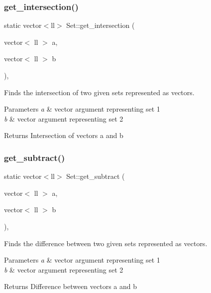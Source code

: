 \subsubsection{\texorpdfstring{get\+\_\+intersection()}{get\_intersection()}}
{\footnotesize\ttfamily static vector$<$ll$>$ Set\+::get\+\_\+intersection (\begin{DoxyParamCaption}\item[{vector$<$ ll $>$}]{a,  }\item[{vector$<$ ll $>$}]{b }\end{DoxyParamCaption})\hspace{0.3cm}{\ttfamily [inline]}, {\ttfamily [static]}}



Finds the intersection of two given sets represented as vectors. 


\begin{DoxyParams}{Parameters}
{\em a} & vector argument representing set 1 \\
\hline
{\em b} & vector argument representing set 2 \\
\hline
\end{DoxyParams}
\begin{DoxyReturn}{Returns}
Intersection of vectors a and b 
\end{DoxyReturn}
\mbox{\label{classSet_af26ca0bfd2f6eb413c2265698801e5fd}} 
\subsubsection{\texorpdfstring{get\+\_\+subtract()}{get\_subtract()}}
{\footnotesize\ttfamily static vector$<$ll$>$ Set\+::get\+\_\+subtract (\begin{DoxyParamCaption}\item[{vector$<$ ll $>$}]{a,  }\item[{vector$<$ ll $>$}]{b }\end{DoxyParamCaption})\hspace{0.3cm}{\ttfamily [inline]}, {\ttfamily [static]}}



Finds the difference between two given sets represented as vectors. 


\begin{DoxyParams}{Parameters}
{\em a} & vector argument representing set 1 \\
\hline
{\em b} & vector argument representing set 2 \\
\hline
\end{DoxyParams}
\begin{DoxyReturn}{Returns}
Difference between vectors a and b 
\end{DoxyReturn}
\mbox{\label{classSet_a02f3000f63dbbfcc1152ddaf780663c4}} 
